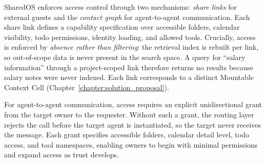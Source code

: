 SharedOS enforces access control through two mechanisms: \textit{share links} for external guests and the \textit{contact graph} for agent-to-agent communication. Each share link defines a capability specification over accessible folders, calendar visibility, todo permissions, identity loading, and allowed tools. Crucially, access is enforced by \textit{absence rather than filtering}: the retrieval index is rebuilt per link, so out-of-scope data is never present in the search space. A query for ``salary information'' through a project-scoped link therefore returns no results because salary notes were never indexed. Each link corresponds to a distinct Mountable Context Cell (Chapter~\ref{chapter:solution_proposal}).

For agent-to-agent communication, access requires an explicit unidirectional grant from the target owner to the requester. Without such a grant, the routing layer rejects the call before the target agent is instantiated, so the target never receives the message. Each grant specifies accessible folders, calendar detail level, todo access, and tool namespaces, enabling owners to begin with minimal permissions and expand access as trust develops.
